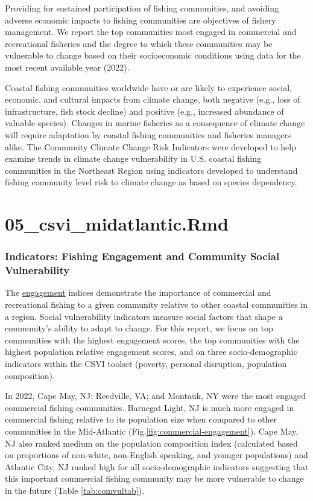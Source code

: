 \documentclass[
  10pt,
]{article}
\begin{document}
Providing for sustained participation of fishing communities, and avoiding adverse economic impacts to fishing communities are objectives of fishery management. We report the top communities most engaged in commercial and recreational fisheries and the degree to which these communities may be vulnerable to change based on their socioeconomic conditions using data for the most recent available year (2022).

Coastal fishing communities worldwide have or are likely to experience social, economic, and cultural impacts from climate change, both negative (e.g., loss of infrastructure, fish stock decline) and positive (e.g., increased abundance of valuable species). Changes in marine fisheries as a consequence of climate change will require adaptation by coastal fishing communities and fisheries managers alike. The Community Climate Change Risk Indicators were developed to help examine trends in climate change vulnerability in U.S. coastal fishing communities in the Northeast Region using indicators developed to understand fishing community level risk to climate change as based on species dependency.

\section{05\_csvi\_midatlantic.Rmd}\label{csvi_midatlantic.rmd}

\subsubsection{Indicators: Fishing Engagement and Community Social Vulnerability}\label{indicators-fishing-engagement-and-community-social-vulnerability}

The \href{https://noaa-edab.github.io/catalog/engagement.html}{engagement} indices demonstrate the importance of commercial and recreational fishing to a given community relative to other coastal communities in a region. Social vulnerability indicators measure social factors that shape a community's ability to adapt to change. For this report, we focus on top communities with the highest engagement scores, the top communities with the highest population relative engagement scores, and on three socio-demographic indicators within the CSVI toolset (poverty, personal disruption, population composition).

In 2022, Cape May, NJ; Reedville, VA; and Montauk, NY were the most engaged commercial fishing communities. Barnegat Light, NJ is much more engaged in commercial fishing relative to its population size when compared to other communities in the Mid-Atlantic (Fig.\ref{fig:commercial-engagement}). Cape May, NJ also ranked medium on the population composition index (calculated based on proportions of non-white, non-English speaking, and younger populations) and Atlantic City, NJ ranked high for all socio-demographic indicators suggesting that this important commercial fishing community may be more vulnerable to change in the future (Table \ref{tab:comvultab}).
\end{document}
